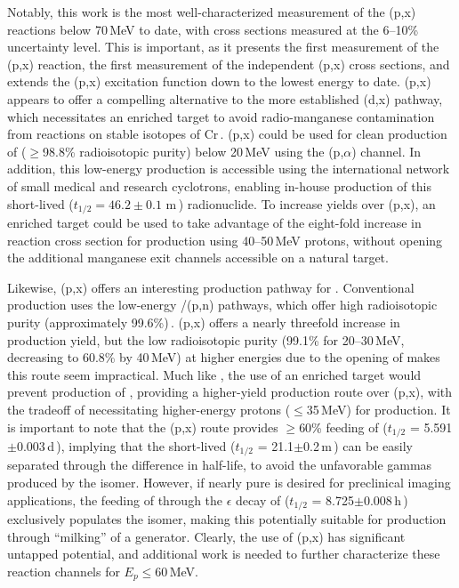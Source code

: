 Notably, this work is the most well-characterized measurement of the (p,x) reactions below 70\,MeV to date, with cross sections measured  at the 6--10\% uncertainty level.
This is important, as it presents the first measurement of the (p,x) reaction,  the first measurement of the independent (p,x) cross sections, and extends the (p,x) excitation function down to the lowest energy to date. 
(p,x) appears to offer a compelling alternative to the more established (d,x) pathway, which necessitates an enriched  target to avoid radio-manganese contamination from reactions on stable isotopes of Cr\,\cite{Klein2000}.
(p,x) could be used for clean production of   ($\geq$98.8\% radioisotopic purity) below 20\,MeV using the (p,$\alpha$) channel.
In addition, this low-energy production is accessible using the international network of small medical and research cyclotrons, enabling in-house production of this short-lived ($t_{1/2}=46.2\pm0.1$ m\,\cite{Wang2017}) radionuclide.
To increase yields over (p,x), an enriched  target could be used to take advantage of the eight-fold increase in reaction cross section for production using 40--50\,MeV protons, without opening the additional manganese exit channels accessible on a natural target.



Likewise, (p,x) offers an interesting production pathway for  .
Conventional production uses the low-energy /(p,n) pathways, which offer high radioisotopic purity (approximately 99.6\%)\,\cite{Graves2015,Wooten2015}.
(p,x) offers a nearly threefold increase in production yield, but the low radioisotopic purity (99.1\% for 20--30\,MeV, decreasing to 60.8\% by 40\,MeV) at higher energies due to the opening of  makes this route seem impractical.
Much like , the use of an enriched  target would prevent production of , providing a higher-yield production route over   (p,x), with the tradeoff of necessitating higher-energy protons ($\leq$35\,MeV) for production.
It is important to note that the (p,x) route provides $\geq$60\% feeding of  ($t_{1/2}$ = 5.591$\pm$0.003\,d\,\cite{Dong2015}), implying that the short-lived   ($t_{1/2}$ = 21.1$\pm$0.2\,m\,\cite{Dong2015}) can be easily separated through the difference in half-life, to avoid the unfavorable gammas produced by the isomer. 
However, if nearly pure  is desired for preclinical imaging applications, the feeding of  through the $\epsilon$ decay of  ($t_{1/2}$ = 8.725$\pm$0.008\,h\,\cite{Dong2015}) exclusively populates the isomer, making this potentially suitable for production through \enquote{milking} of a  generator.
Clearly, the use of (p,x) has significant untapped potential, and additional work is needed to further characterize these reaction channels for $E_p \leq$60\,MeV.


